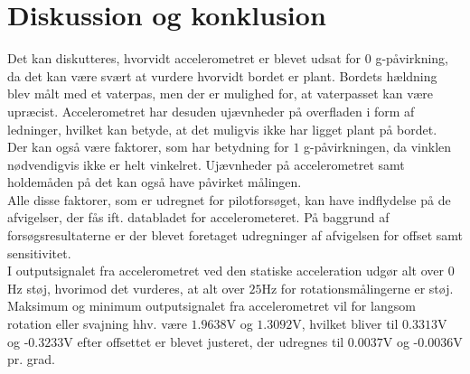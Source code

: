 \section{Diskussion og konklusion}
Det kan diskutteres, hvorvidt accelerometret er blevet udsat for $0$ g-påvirkning, da det kan være svært at vurdere hvorvidt bordet er plant. Bordets hældning blev målt med et vaterpas, men der er mulighed for, at vaterpasset kan være upræcist. Accelerometret har desuden ujævnheder på overfladen i form af ledninger, hvilket kan betyde, at det muligvis ikke har ligget plant på bordet. \\
Der kan også være faktorer, som har betydning for $1$ g-påvirkningen, da vinklen nødvendigvis ikke er helt vinkelret. Ujævnheder på accelerometret samt holdemåden på det kan også have påvirket målingen. \\
Alle disse faktorer, som er udregnet for pilotforsøget, kan have indflydelse på de afvigelser, der fås ift. databladet for accelerometeret. På baggrund af forsøgsresultaterne er der blevet foretaget udregninger af afvigelsen for offset samt sensitivitet.\\

\noindent I outputsignalet fra accelerometret ved den statiske acceleration udgør alt over $0$Hz støj, hvorimod det vurderes, at alt over $25$Hz for rotationsmålingerne er støj. Maksimum og minimum outputsignalet fra accelerometret vil for langsom rotation eller svajning hhv. være $1.9638$V og $1.3092$V, hvilket bliver til $0.3313$V og -$0.3233$V efter offsettet er blevet justeret, der udregnes til $0.0037$V og -$0.0036$V pr. grad. \\ \clearpage